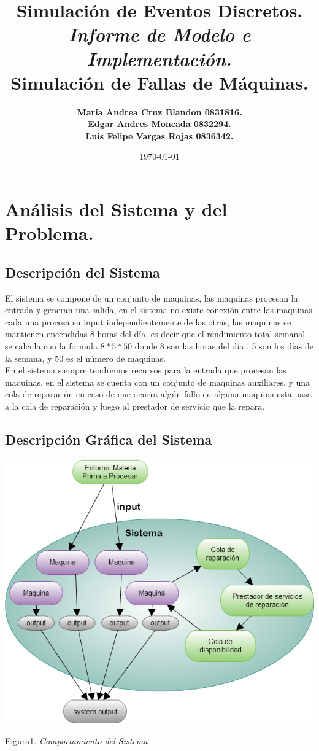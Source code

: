 \documentclass[10pt]{article}
\title{Simulación de Eventos Discretos.\\ \emph{Informe de Modelo e Implementación.} \\ \textbf{Simulación de Fallas de Máquinas.} }
\author{\textbf{María Andrea Cruz Blandon  0831816.} \\ \textbf{Edgar Andres Moncada 0832294.  }\\ \textbf{Luis Felipe Vargas Rojas 0836342. }}
\date{\today}
\begin{document}
\maketitle

\section{Análisis del Sistema y del Problema.}
\subsection{Descripción del Sistema}
El sistema se compone de un conjunto de maquinas, las maquinas procesan la entrada y generan una salida, en el  sistema no existe conexión entre las maquinas cada una procesa su input independientemente de las otras, las maquinas se mantienen encendidas 8 horas del día, es decir que el rendimiento total semanal se calcula con la formula $8*5*50$ donde 8 son las  horas del dia , 5 son los días de la  semana, y 50 es el número de maquinas.\\

En el sistema siempre tendremos recursos para la entrada que procesan las maquinas, en el sistema se cuenta con un conjunto de maquinas auxiliares, y una cola de reparación en caso de que ocurra algún fallo en alguna maquina esta pasa a la cola de reparación y luego al prestador de servicio que la repara.


\subsection{Descripción Gráfica del Sistema}
\begin{center}

\includegraphics[scale=0.47]{Simulacion.png}

Figura1. \emph{Comportamiento del Sistema}
\end{center}
\end{document}
